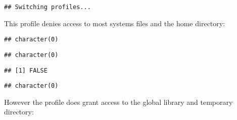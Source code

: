 


\begin{knitrout}
\color{fgcolor}\begin{kframe}
\begin{alltt}
\hlstd{(}\hlstd{)}
\end{alltt}
\begin{verbatim}
## Switching profiles...
\end{verbatim}
\end{kframe}
\end{knitrout}


This profile denies access to most systems files and the home directory:

\begin{knitrout}
\color{fgcolor}\begin{kframe}
\begin{alltt}
\hlstd{(}\hlstd{)}
\end{alltt}
\begin{verbatim}
## character(0)
\end{verbatim}
\begin{alltt}
\hlstd{(}\hlstd{)}
\end{alltt}
\begin{verbatim}
## character(0)
\end{verbatim}
\begin{alltt}
\hlstd{(}\hlstd{)}
\end{alltt}


{\ttfamily\noindent{}}\begin{verbatim}
## [1] FALSE
\end{verbatim}
\begin{alltt}
\hlstd{(}\hlstd{)}
\end{alltt}
\begin{verbatim}
## character(0)
\end{verbatim}
\end{kframe}
\end{knitrout}


However the profile does grant access to the global library and temporary directory:

